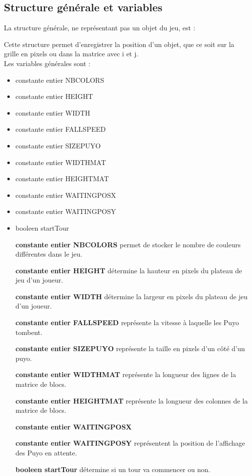 \documentclass[11pt]{report}
\begin{document}
\subsection{Structure générale et variables}

La structure générale, ne représentant pas un objet du jeu, est : 


Cette structure permet d'enregistrer la position d'un objet, que ce soit sur la grille en pixels ou dans la matrice avec i et j. 
\\

Les variables générales sont : 
\begin{itemize}
\item constante entier NBCOLORS 
\item constante entier HEIGHT
\item constante entier WIDTH
\item constante entier FALLSPEED 
\item constante entier SIZEPUYO
\item constante entier WIDTHMAT
\item constante entier HEIGHTMAT
\item constante entier WAITINGPOSX
\item constante entier WAITINGPOSY
\item booleen startTour
\\
\end{itemize}

\begin{itemize}
\item[\textbf{constante entier NBCOLORS}] permet de stocker le nombre de couleurs différentes dans le jeu.
\item[\textbf{constante entier HEIGHT}] détermine la hauteur en pixels du plateau de jeu d’un joueur.
\item[\textbf{constante entier WIDTH}] détermine la largeur en pixels du plateau de jeu d’un joueur.
\item[\textbf{constante entier FALLSPEED}] représente la vitesse à laquelle les Puyo tombent.
\item[\textbf{constante entier SIZEPUYO}] représente la taille en pixels d’un côté d’un puyo.
\item[\textbf{constante entier WIDTHMAT}] représente la longueur des lignes de la matrice de blocs.
\item[\textbf{constante entier HEIGHTMAT}] représente la longueur des colonnes de la matrice de blocs.
\item[\textbf{constante entier WAITINGPOSX}]
\item[\textbf{constante entier WAITINGPOSY}] représentent la position de l'affichage des Puyo en attente. 
\item[\textbf{booleen startTour}] détermine si un tour va commencer ou non. 

\end{itemize}
\end{document}
